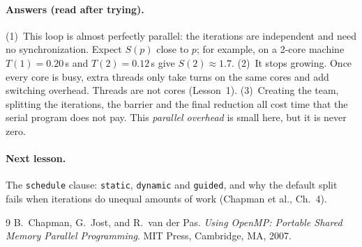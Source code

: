 \documentclass[11pt,a4paper]{article}
\begin{document}
\paragraph{Answers (read after trying).}
(1)~This loop is almost perfectly parallel: the iterations are independent and need no
synchronization. Expect $S(p)$ close to $p$; for example, on a 2-core machine
$T(1)=0.20$\,s and $T(2)=0.12$\,s give $S(2)\approx1.7$.
(2)~It stops growing. Once every core is busy, extra threads only take turns on the same
cores and add switching overhead. Threads are not cores (Lesson~1).
(3)~Creating the team, splitting the iterations, the barrier and the final reduction all
cost time that the serial program does not pay. This \emph{parallel overhead} is small
here, but it is never zero.

\paragraph{Next lesson.} The \texttt{schedule} clause: \texttt{static}, \texttt{dynamic} and
\texttt{guided}, and why the default split fails when iterations do unequal amounts of work
(Chapman et al., Ch.~4).

\begin{thebibliography}{9}
 B.~Chapman, G.~Jost, and R.~van der Pas. \emph{Using OpenMP: Portable
  Shared Memory Parallel Programming}. MIT Press, Cambridge, MA, 2007.
\end{thebibliography}
\end{document}
